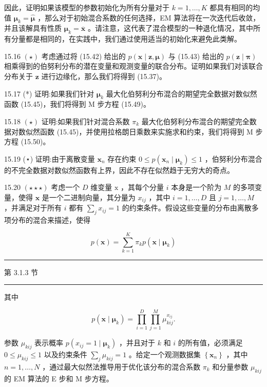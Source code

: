 \documentclass[10pt]{report}
\newcommand{\HRule}{\begin{center}\rule{0.9\linewidth}{0.2mm}\end{center}}
\begin{document}
因此，证明如果该模型的参数初始化为所有分量对于 \(k = 1,\ldots ,K\) 都具有相同的均值 \({\mathbf{\mu }}_{k} = \widehat{\mathbf{\mu }}\) ，那么对于初始混合系数的任何选择，EM 算法将在一次迭代后收敛，并且该解具有性质 \({\mathbf{\mu }}_{k} = \overline{\mathbf{x}}\) 。请注意，这代表了混合模型的一种退化情况，其中所有分量都是相同的，在实践中，我们通过使用适当的初始化来避免此类解。

15.16 \(\left( \star \right)\) 考虑通过将 (15.42) 给出的 \(p\left( {\mathbf{x} \mid  \mathbf{z},\mathbf{\mu }}\right)\) 与 (15.43) 给出的 \(p\left( {\mathbf{z} \mid  \mathbf{\pi }}\right)\) 相乘得到的伯努利分布的潜在变量和观测变量的联合分布。证明如果我们对该联合分布关于 \(\mathbf{z}\) 进行边缘化，那么我们将得到 (15.37)。

15.17 (*) 证明:如果我们针对 \({\mathbf{\mu }}_{k}\) 最大化伯努利分布混合的期望完全数据对数似然函数 (15.45)，我们将得到 M 步方程 (15.49)。

15.18 \(\left( \star \right)\) 证明:如果我们针对混合系数 \({\pi }_{k}\) 最大化伯努利分布混合的期望完全数据对数似然函数 (15.45)，并使用拉格朗日乘数来实施求和约束，我们将得到 M 步方程 (15.50)。

15.19 (⋆) 证明:由于离散变量 \({\mathbf{x}}_{n}\) 存在约束 \(0 \leq  p\left( {{\mathbf{x}}_{n} \mid  {\mathbf{\mu }}_{k}}\right)  \leq  1\) ，伯努利分布混合的不完全数据对数似然函数有上界，因此不存在似然趋于无穷大的奇点。

15.20 \(\left( {\star  \star   \star  }\right)\) 考虑一个 \(D\) 维变量 \(\mathrm{x}\) ，其每个分量 \(i\) 本身是一个阶为 \(M\) 的多项变量，使得 \(\mathbf{x}\) 是一个二进制向量，其分量为 \({x}_{ij}\) ，其中 \(i = 1,\ldots ,D\) 且 \(j = 1,\ldots ,M\) ，并满足对于所有 \(i\) 都有 \(\mathop{\sum }\limits_{j}{x}_{ij} = 1\) 的约束条件。假设这些变量的分布由离散多项分布的混合来描述，使得

\[
p\left( \mathbf{x}\right)  = \mathop{\sum }\limits_{{k = 1}}^{K}{\pi }_{k}p\left( {\mathbf{x} \mid  {\mathbf{\mu }}_{k}}\right)  \tag{15.66}
\]

\HRule

第 3.1.3 节

\HRule

其中

\[
p\left( {\mathbf{x} \mid  {\mathbf{\mu }}_{k}}\right)  = \mathop{\prod }\limits_{{i = 1}}^{D}\mathop{\prod }\limits_{{j = 1}}^{M}{\mu }_{kij}^{{x}_{ij}}. \tag{15.67}
\]

参数 \({\mu }_{kij}\) 表示概率 \(p\left( {{x}_{ij} = 1 \mid  {\mathbf{\mu }}_{k}}\right)\) ，并且对于 \(k\) 和 \(i\) 的所有值，必须满足 \(0 \leq  {\mu }_{kij} \leq  1\) 以及约束条件 \(\mathop{\sum }\limits_{j}{\mu }_{kij} = 1\) 。给定一个观测数据集 \(\left\{  {\mathbf{x}}_{n}\right\}\) ，其中 \(n = 1,\ldots ,N\) ，通过最大似然法推导用于优化该分布的混合系数 \({\pi }_{k}\) 和分量参数 \({\mu }_{kij}\) 的 EM 算法的 E 步和 M 步方程。
\end{document}
